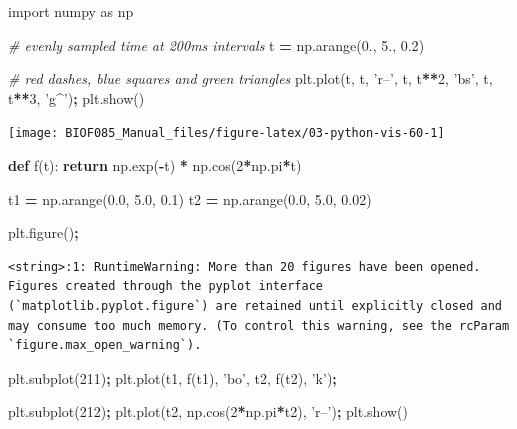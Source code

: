 \documentclass[
  letterpaper,
]{scrbook}
\newenvironment{Shaded}{\begin{snugshade}}{\end{snugshade}}
\newcommand{\CommentTok}[1]{\textcolor[rgb]{0.56,0.35,0.01}{\textit{#1}}}
\newcommand{\ControlFlowTok}[1]{\textcolor[rgb]{0.13,0.29,0.53}{\textbf{#1}}}
\newcommand{\DecValTok}[1]{\textcolor[rgb]{0.00,0.00,0.81}{#1}}
\newcommand{\FloatTok}[1]{\textcolor[rgb]{0.00,0.00,0.81}{#1}}
\newcommand{\ImportTok}[1]{#1}
\newcommand{\KeywordTok}[1]{\textcolor[rgb]{0.13,0.29,0.53}{\textbf{#1}}}
\newcommand{\NormalTok}[1]{#1}
\newcommand{\OperatorTok}[1]{\textcolor[rgb]{0.81,0.36,0.00}{\textbf{#1}}}
\newcommand{\StringTok}[1]{\textcolor[rgb]{0.31,0.60,0.02}{#1}}
\begin{document}
\begin{Shaded}
\begin{Highlighting}[]
\ImportTok{import}\NormalTok{ numpy }\ImportTok{as}\NormalTok{ np}

\CommentTok{# evenly sampled time at 200ms intervals}
\NormalTok{t }\OperatorTok{=}\NormalTok{ np.arange(}\FloatTok{0.}\NormalTok{, }\FloatTok{5.}\NormalTok{, }\FloatTok{0.2}\NormalTok{)}

\CommentTok{# red dashes, blue squares and green triangles}
\NormalTok{plt.plot(t, t, }\StringTok{'r--'}\NormalTok{, t, t}\OperatorTok{**}\DecValTok{2}\NormalTok{, }\StringTok{'bs'}\NormalTok{, t, t}\OperatorTok{**}\DecValTok{3}\NormalTok{, }\StringTok{'g^'}\NormalTok{)}\OperatorTok{;}
\NormalTok{plt.show()}
\end{Highlighting}
\end{Shaded}

\begin{center}\texttt{[image: BIOF085\_Manual\_files/figure-latex/03-python-vis-60-1]} \end{center}

\begin{Shaded}
\begin{Highlighting}[]
\KeywordTok{def}\NormalTok{ f(t):}
    \ControlFlowTok{return}\NormalTok{ np.exp(}\OperatorTok{-}\NormalTok{t) }\OperatorTok{*}\NormalTok{ np.cos(}\DecValTok{2}\OperatorTok{*}\NormalTok{np.pi}\OperatorTok{*}\NormalTok{t)}

\NormalTok{t1 }\OperatorTok{=}\NormalTok{ np.arange(}\FloatTok{0.0}\NormalTok{, }\FloatTok{5.0}\NormalTok{, }\FloatTok{0.1}\NormalTok{)}
\NormalTok{t2 }\OperatorTok{=}\NormalTok{ np.arange(}\FloatTok{0.0}\NormalTok{, }\FloatTok{5.0}\NormalTok{, }\FloatTok{0.02}\NormalTok{)}

\NormalTok{plt.figure()}\OperatorTok{;}
\end{Highlighting}
\end{Shaded}

\begin{verbatim}
<string>:1: RuntimeWarning: More than 20 figures have been opened. Figures created through the pyplot interface (`matplotlib.pyplot.figure`) are retained until explicitly closed and may consume too much memory. (To control this warning, see the rcParam `figure.max_open_warning`).
\end{verbatim}

\begin{Shaded}
\begin{Highlighting}[]
\NormalTok{plt.subplot(}\DecValTok{211}\NormalTok{)}\OperatorTok{;}
\NormalTok{plt.plot(t1, f(t1), }\StringTok{'bo'}\NormalTok{, t2, f(t2), }\StringTok{'k'}\NormalTok{)}\OperatorTok{;}

\NormalTok{plt.subplot(}\DecValTok{212}\NormalTok{)}\OperatorTok{;}
\NormalTok{plt.plot(t2, np.cos(}\DecValTok{2}\OperatorTok{*}\NormalTok{np.pi}\OperatorTok{*}\NormalTok{t2), }\StringTok{'r--'}\NormalTok{)}\OperatorTok{;}
\NormalTok{plt.show()}
\end{Highlighting}
\end{Shaded}
\end{document}
